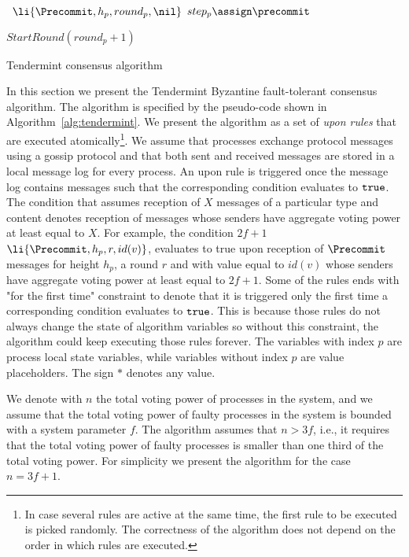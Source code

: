 \begin{algorithm}[htb!]
\begin{algorithmic}[1]
		\SHORTSPACE 
		 \label{line:tab:onTimeoutPrevote} 
			\STATE \Broadcast \ $\li{\Precommit,h_p,round_p,\nil}$   
			\label{line:tab:precommit-nil-onTimeout}
			\STATE $step_p \assign \precommit$ 
		\ENDIF	
		\ENDFUNCTION
		
		\SHORTSPACE 
		 \label{line:tab:onTimeoutPrecommit} 
			\STATE $StartRound(round_p + 1)$ \label{line:tab:nextRound} 
		\ENDIF
		\ENDFUNCTION	
	\end{algorithmic} \caption{Tendermint consensus algorithm}
	\label{alg:tendermint} 
\end{algorithm}

In this section we present the Tendermint Byzantine fault-tolerant consensus
algorithm. The algorithm is specified by the pseudo-code shown in
Algorithm~\ref{alg:tendermint}. We present the algorithm as a set of \emph{upon
rules} that are executed atomically\footnote{In case several rules are active
at the same time, the first rule to be executed is picked randomly. The
correctness of the algorithm does not depend on the order in which rules are
executed.}. We assume that processes exchange protocol messages using a gossip
protocol and that both sent and received messages are stored in a local message
log for every process. An upon rule is triggered once the message log contains
messages such that the corresponding condition evaluates to $\tt{true}$. The
condition that assumes reception of $X$ messages of a particular type and
content denotes reception of messages whose senders have aggregate voting power at
least equal to $X$. For example, the condition $2f+1$ $\li{\Precommit,h_p,r,id(v)}$,  
evaluates to true upon reception of $\Precommit$ messages for height $h_p$, 
a round $r$ and with value equal to $id(v)$ whose senders have aggregate voting 
power at least equal to $2f+1$. Some of the rules ends with "for the first time" constraint 
to denote that it is triggered only the first time a corresponding condition evaluates 
to $\tt{true}$. This is because those rules do not always change the state of algorithm 
variables so without this constraint, the algorithm could keep 
executing those rules forever. The variables with index $p$ are process local state
variables, while variables without index $p$ are value placeholders. The sign
$*$ denotes any value.    

We denote with $n$ the total voting power of processes in the system, and we
assume that the total voting power of faulty processes in the system is bounded
with a system parameter $f$.  The algorithm assumes that $n > 3f$, i.e., it
requires that the total voting power of faulty processes is smaller than one
third of the total voting power. For simplicity we present the algorithm for
the case $n = 3f + 1$.

